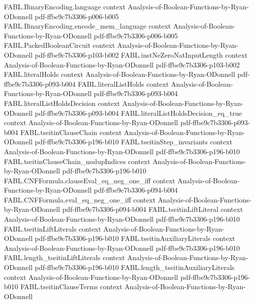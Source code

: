 \begin{theorem}
  {FABL.BinaryEncoding.language}
  {context}
  {Analysis-of-Boolean-Functions-by-Ryan-ODonnell}
  {pdf-ffbe9c7b3306-p006-b005}
\proofstep
  {FABL.BinaryEncoding.encode_mem_language}
  {context}
  {Analysis-of-Boolean-Functions-by-Ryan-ODonnell}
  {pdf-ffbe9c7b3306-p006-b005}
\proofstep
  {FABL.PackedBooleanCircuit}
  {context}
  {Analysis-of-Boolean-Functions-by-Ryan-ODonnell}
  {pdf-ffbe9c7b3306-p103-b002}
\proofstep
  {FABL.instNeZeroNatInputLength}
  {context}
  {Analysis-of-Boolean-Functions-by-Ryan-ODonnell}
  {pdf-ffbe9c7b3306-p103-b002}
\proofstep
  {FABL.literalHolds}
  {context}
  {Analysis-of-Boolean-Functions-by-Ryan-ODonnell}
  {pdf-ffbe9c7b3306-p093-b004}
\proofstep
  {FABL.literalListHolds}
  {context}
  {Analysis-of-Boolean-Functions-by-Ryan-ODonnell}
  {pdf-ffbe9c7b3306-p093-b004}
\proofstep
  {FABL.literalListHoldsDecision}
  {context}
  {Analysis-of-Boolean-Functions-by-Ryan-ODonnell}
  {pdf-ffbe9c7b3306-p093-b004}
\proofstep
  {FABL.literalListHoldsDecision_eq_true}
  {context}
  {Analysis-of-Boolean-Functions-by-Ryan-ODonnell}
  {pdf-ffbe9c7b3306-p093-b004}
\proofstep
  {FABL.tseitinClauseChain}
  {context}
  {Analysis-of-Boolean-Functions-by-Ryan-ODonnell}
  {pdf-ffbe9c7b3306-p196-b010}
\proofstep
  {FABL.tseitinStep_invariants}
  {context}
  {Analysis-of-Boolean-Functions-by-Ryan-ODonnell}
  {pdf-ffbe9c7b3306-p196-b010}
\proofstep
  {FABL.tseitinClauseChain_nodupIndices}
  {context}
  {Analysis-of-Boolean-Functions-by-Ryan-ODonnell}
  {pdf-ffbe9c7b3306-p196-b010}
\proofstep
  {FABL.CNFFormula.clauseEval_eq_neg_one_iff}
  {context}
  {Analysis-of-Boolean-Functions-by-Ryan-ODonnell}
  {pdf-ffbe9c7b3306-p094-b004}
\proofstep
  {FABL.CNFFormula.eval_eq_neg_one_iff}
  {context}
  {Analysis-of-Boolean-Functions-by-Ryan-ODonnell}
  {pdf-ffbe9c7b3306-p094-b004}
\proofstep
  {FABL.tseitinLiftLiteral}
  {context}
  {Analysis-of-Boolean-Functions-by-Ryan-ODonnell}
  {pdf-ffbe9c7b3306-p196-b010}
\proofstep
  {FABL.tseitinLiftLiterals}
  {context}
  {Analysis-of-Boolean-Functions-by-Ryan-ODonnell}
  {pdf-ffbe9c7b3306-p196-b010}
\proofstep
  {FABL.tseitinAuxiliaryLiterals}
  {context}
  {Analysis-of-Boolean-Functions-by-Ryan-ODonnell}
  {pdf-ffbe9c7b3306-p196-b010}
\proofstep
  {FABL.length_tseitinLiftLiterals}
  {context}
  {Analysis-of-Boolean-Functions-by-Ryan-ODonnell}
  {pdf-ffbe9c7b3306-p196-b010}
\proofstep
  {FABL.length_tseitinAuxiliaryLiterals}
  {context}
  {Analysis-of-Boolean-Functions-by-Ryan-ODonnell}
  {pdf-ffbe9c7b3306-p196-b010}
\proofstep
  {FABL.tseitinClauseTerms}
  {context}
  {Analysis-of-Boolean-Functions-by-Ryan-ODonnell}

\end{theorem}
